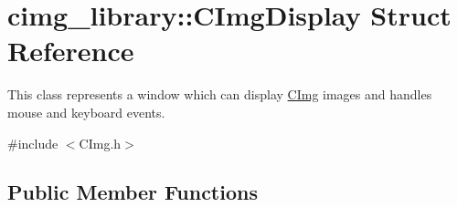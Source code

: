 \hypertarget{structcimg__library_1_1_c_img_display}{
\section{cimg\_\-library::CImgDisplay Struct Reference}
\label{structcimg__library_1_1_c_img_display}
}


This class represents a window which can display \hyperlink{structcimg__library_1_1_c_img}{CImg} images and handles mouse and keyboard events.  




{\ttfamily \#include $<$CImg.h$>$}

\subsection*{Public Member Functions}
